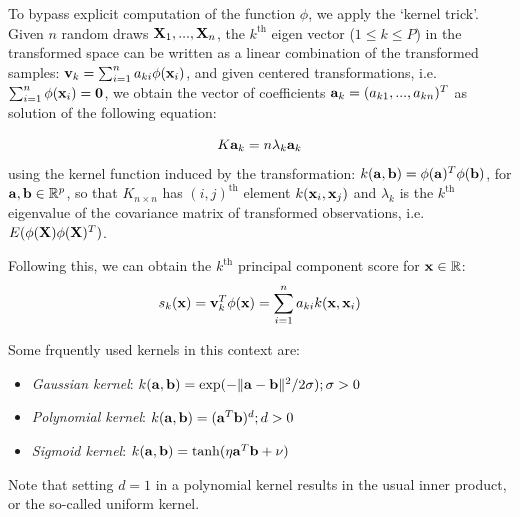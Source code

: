 \documentclass[10pt, conference, compsocconf]{IEEEtran}
\begin{document}
To bypass explicit computation of the function $\phi$, we apply the `kernel trick'. Given $n$ random draws ${\mathbf{X}}_1,...,{\mathbf{X}}_n$, the $k^\text{th}$ eigen                                                                                                                                                                              vector ($1\leq k \leq P$) in the transformed space can be written as a linear combination of the transformed samples: ${\bf{v}}_k = \sum_{i=1}^n a_{ki} \phi ({\bf{x}}_i)$, and given centered transformations, i.e. $\sum_{i=1}^n \phi({\bf{x}}_i) = \bf0$, we obtain the vector of coefficients ${\bf{a}}_k = (a_{k1},...,a_{kn})^T$ as solution of the following equation:

\begin{equation}
K {\bf{a}}_k = n \lambda_k {\bf{a}}_k
\end{equation}
using the kernel function induced by the transformation: $k( {\bf{a}}, {\bf{b}}) = \phi({\bf{a}})^T \phi({\bf{b}})$, for ${\bf{a}}, {\bf{b}} \in \mathbb R^p$, so that $K_{n \times n}$ has $(i,j)^\text{th}$ element $k({\bf{x}}_i, {\bf{x}}_j)$ and $\lambda_k$ is the $k^\text{th}$ eigenvalue of the covariance matrix of transformed observations, i.e. $E( \phi({\mathbf{X}}) \phi({\mathbf{X}})^T )$.

Following this, we can obtain the $k^\text{th}$ principal component score for ${\bf{x}} \in \mathbb R$:
\begin{equation}
s_k ({\bf{x}}) = {\bf{v}}_k^T \phi ({\bf{x}}) = \sum_{i=1}^n a_{ki} k( {\bf{x}}, {\bf{x}}_i)
\end{equation}

Some frquently used kernels in this context are:

\begin{itemize}
\item \textit{Gaussian kernel}: $k({\bf{a}}, {\bf{b}}) = \exp ( - \| {\bf{a}} - {\bf{b}} \|^2 / 2 \sigma); \sigma>0 $
\item \textit{Polynomial kernel}: $k({\bf{a}}, {\bf{b}}) = ({\bf{a}}^T {\bf{b}})^d; d>0$
\item \textit{Sigmoid kernel}: $k({\bf{a}}, {\bf{b}}) = \tanh (\eta {\bf{a}}^T {\bf{b}} + \nu)$
\end{itemize}
Note that setting $d = 1$ in a polynomial kernel results in the usual inner product, or the so-called uniform kernel.

%
\end{document}

